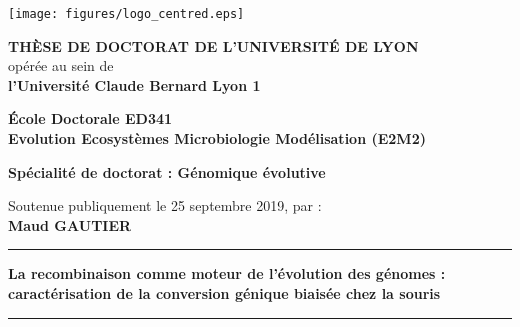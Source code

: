 

\begingroup



\setlength{\parindent}{0pt}
\thispagestyle{empty}


\begin{center}
\texttt{[image: figures/logo\_centred.eps]} %
\end{center}


\fontsize{11pt}{13pt}\selectfont

\vspace{1cm}

\begin{center}
\fontsize{14pt}{16pt}\selectfont
\textbf{\uppercase{Thèse de doctorat de l'université de Lyon}}\\
\fontsize{12pt}{14pt}\selectfont
opérée au sein de\\
\textbf{l'Université Claude Bernard Lyon 1}

\vspace{0.5cm}

\textbf{École Doctorale ED341\\%
Evolution Ecosyst\`emes Microbiologie Modélisation (E2M2)}%

\vspace{0.5cm}

\textbf{Spécialité de doctorat : Génomique évolutive}\\


\vspace{1.5cm}

Soutenue publiquement le 25 septembre 2019, par :\\
\vspace{0.1cm}
\fontsize{14pt}{16pt}\selectfont
\textbf{Maud GAUTIER}

\vspace{1.5cm} %

\rule[20pt]{\textwidth}{0.5pt}

\fontsize{25pt}{28pt}\selectfont
\textbf{La recombinaison comme moteur de l'\'evolution des g\'enomes : caract\'erisation de la conversion g\'enique biais\'ee chez la souris}

\rule{\textwidth}{0.5pt}

\vspace{2cm} %
\end{center}


